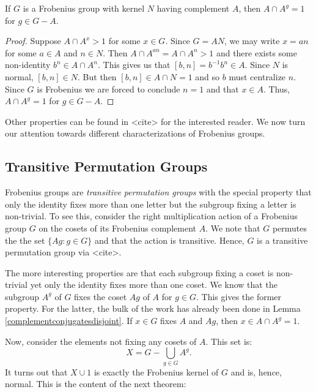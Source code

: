 \documentclass[main.tex]{subfiles}
\begin{document}
\begin{lemma}\label{complementconjugatesdisjoint}
If $G$ is a Frobenius group with kernel $N$ having complement $A$, then $A \cap A^g = 1$ for $g \in G - A$.
\end{lemma}

\begin{proof}
Suppose $A \cap A^x > 1$ for some $x \in G$. Since $G = AN$, we may write $x = an$ for some $a \in A$ and $n \in N$. Then $A \cap A^{an} = A \cap A^n > 1$ and there exists some non-identity $b^n \in A \cap A^n$. This gives us that $[b,n] = b^{-1}b^n \in A$. Since $N$ is normal, $[b, n] \in N$. But then $[b,n] \in A \cap N = 1$ and so $b$ must centralize $n$. Since $G$ is Frobenius we are forced to conclude $n = 1$ and that $x \in A$. Thus, $A \cap A^g = 1$ for $g \in G - A$.
\end{proof}

Other properties can be found in <cite> for the interested reader. We now turn our attention towards different characterizations of Frobenius groups.

\hss

\subsection{Transitive Permutation Groups}

\hss

Frobenius groups are \emph{transitive permutation groups} with the special property that only the identity fixes more than one letter but the subgroup fixing a letter is non-trivial. To see this, consider the right multiplication action of a Frobenius group $G$ on the cosets of its Frobenius complement $A$. We note that $G$ permutes the the set $\{Ag : g \in G \}$ and that the action is transitive. Hence, $G$ is a transitive permutation group via <cite>.

The more interesting properties are that each subgroup fixing a coset is non-trivial yet only the identity fixes more than one coset. We know that the subgroup $A^g$ of $G$ fixes the coset $Ag$ of $A$ for $g \in G$. This gives the former property. For the latter, the bulk of the work has already been done in Lemma \ref{complementconjugatesdisjoint}. If $x \in G$ fixes $A$ and $Ag$, then $x \in A \cap A^g = 1$.

Now, consider the elements not fixing any cosets of $A$. This set is:
$$X = G - \bigcup_{g \in G} A^g\text{.}$$
It turns out that $X \cup {1}$ is exactly the Frobenius kernel of $G$ and is, hence, normal. This is the content of the next theorem:
\end{document}

